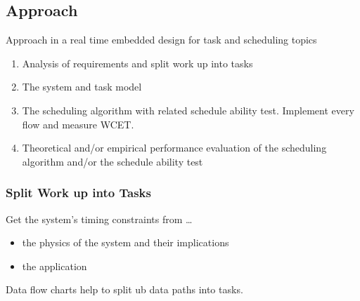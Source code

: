 \subsection{Approach}
Approach in a real time embedded design for task and scheduling topics
\begin{enumerate}
	\item Analysis of requirements and split work up into tasks
	\item The system and task model
	\item The scheduling algorithm with related schedule ability test.
	      Implement every flow and measure WCET.
	\item Theoretical and/or empirical performance evaluation of the scheduling algorithm and/or the schedule ability test
\end{enumerate}

\subsubsection{Split Work up into Tasks}
Get the system's timing constraints from \ldots
\begin{itemize}[label=\ldots]
	\item the physics of the system and their implications
	\item the application
\end{itemize}
Data flow charts help to split ub data paths into tasks.